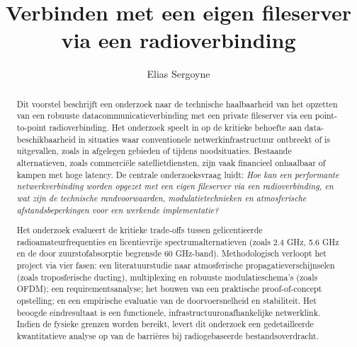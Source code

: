 \documentclass{hogent-article}
\title{Verbinden met een eigen fileserver via een radioverbinding}
\author{Elias Sergoyne}
\begin{document}
\begin{abstract}
Dit voorstel beschrijft een onderzoek naar de technische haalbaarheid van het opzetten van een robuuste datacommunicatieverbinding met een private fileserver via een point-to-point radioverbinding. Het onderzoek speelt in op de kritieke behoefte aan data-beschikbaarheid in situaties waar conventionele netwerkinfrastructuur ontbreekt of is uitgevallen, zoals in afgelegen gebieden of tijdens noodsituaties. Bestaande alternatieven, zoals commerciële satellietdiensten, zijn vaak financieel onhaalbaar of kampen met hoge latency. De centrale onderzoeksvraag luidt: \textit{Hoe kan een performante netwerkverbinding worden opgezet met een eigen fileserver via een radioverbinding, en wat zijn de technische randvoorwaarden, modulatietechnieken en atmosferische afstandsbeperkingen voor een werkende implementatie?}

Het onderzoek evalueert de kritieke trade-offs tussen gelicentieerde radioamateurfrequenties en licentievrije spectrumalternatieven (zoals 2.4 GHz, 5.6 GHz en de door zuurstofabsorptie begrensde 60 GHz-band). Methodologisch verloopt het project via vier fasen: een literatuurstudie naar atmosferische propagatieverschijnselen (zoals troposferische ducting), multiplexing en robuuste modulatieschema's (zoals OFDM); een requirementsanalyse; het bouwen van een praktische proof-of-concept opstelling; en een empirische evaluatie van de doorvoersnelheid en stabiliteit. Het beoogde eindresultaat is een functionele, infrastructuuronafhankelijke netwerklink. Indien de fysieke grenzen worden bereikt, levert dit onderzoek een gedetailleerde kwantitatieve analyse op van de barrières bij radiogebaseerde bestandsoverdracht.
\end{abstract}

\tableofcontents



\printbibliography[heading=bibintoc]
\end{document}
